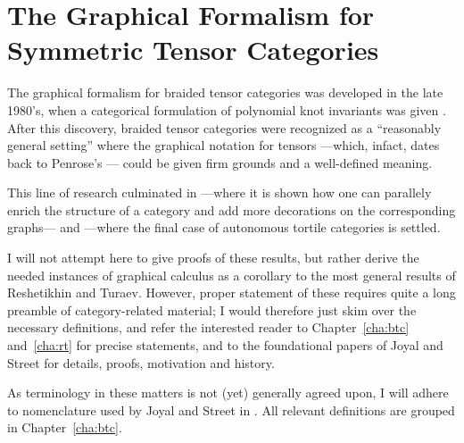 

\chapter{The Graphical Formalism for Symmetric Tensor Categories}
\label{cha:gc}

The graphical formalism for braided tensor categories was developed in
the late 1980's, when a categorical formulation of polynomial knot
invariants was given \cite{freyd-yetter;btc, turaev;yang-baxter}.
After this discovery, braided tensor categories were recognized as a
``reasonably general setting'' \cite{joyal-street;tensor-calculus}
where the graphical notation for tensors ---which, infact, dates back
to Penrose's \cite{penrose;negative-dimensional-tensors}--- could be
given firm grounds and a well-defined meaning.

This line of research culminated in
\cite{joyal-street;tensor-calculus} ---where it is shown how one can
parallely enrich the structure of a category and add more decorations
on the corresponding graphs--- and
\cite{reshetikhin-turaev;ribbon-graphs} ---where the final case of
autonomous tortile categories is settled.

I will not attempt here to give proofs of these results, but rather
derive the needed instances of graphical calculus as a
corollary to the most general results of Reshetikhin and Turaev.
However, proper statement of these requires quite a long preamble of
category-related material; I would therefore just skim over the
necessary definitions, and refer the interested reader to
Chapter~\ref{cha:btc} and~\ref{cha:rt} for precise statements, and to the
foundational papers of Joyal and Street
\cite{joyal-street;tensor-calculus, joyal-street;btc} for details,
proofs, motivation and history.

As terminology in these matters is not (yet) generally agreed upon, I
will adhere to nomenclature used by Joyal and Street in
\cite{joyal-street;tensor-calculus, joyal-street;btc}. All relevant
definitions are grouped in Chapter~\ref{cha:btc}.


